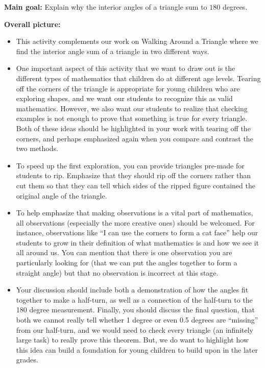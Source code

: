 \documentclass[nooutcomes,noauthor]{ximera}
\begin{document}
\begin{instructorNotes} 



{\bf Main goal:} Explain why the interior angles of a triangle sum to $180$ degrees.

{\bf Overall picture:} 
\begin{itemize}
\item This activity complements our work on Walking Around a Triangle where we find the interior angle sum of a triangle in two different ways.
\item One important aspect of this activity that we want to draw out is the different types of mathematics that children do at different age levels. Tearing off the corners of the triangle is appropriate for young children who are exploring shapes, and we want our students to recognize this as valid mathematics. However, we also want our students to realize that checking examples is not enough to prove that something is true for every triangle. Both of these ideas should be highlighted in your work with tearing off the corners, and perhaps emphasized again when you compare and contrast the two methods.
\item To speed up the first exploration, you can provide triangles pre-made for students to rip. Emphasize that they should rip off the corners rather than cut them so that they can tell which sides of the ripped figure contained the original angle of the triangle.
\item To help emphasize that making observations is a vital part of mathematics, all observations (especially the more creative ones) should be welcomed. For instance, observations like ``I can use the corners to form a cat face'' help our students to grow in their definition of what mathematics is and how we see it all around us.  You can mention that there is one observation you are particularly looking for (that we can put the angles together to form a straight angle) but that no observation is incorrect at this stage.
\item Your discussion should include both a demonstration of how the angles fit together to make a half-turn, as well as a connection of the half-turn to the 180 degree measurement. Finally, you should discuss the final question, that both we cannot really tell whether 1 degree or even 0.5 degrees are ``missing'' from our half-turn, and we would need to check every triangle (an infinitely large task) to really prove this theorem. But, we do want to highlight how this idea can build a foundation for young children to build upon in the later grades.

\end{itemize}
\end{instructorNotes}
\end{document}
